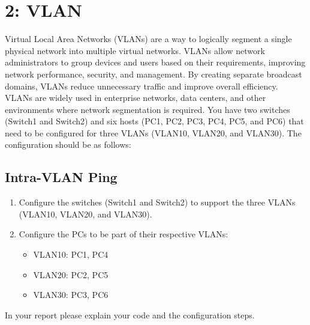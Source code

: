 \section{2: VLAN}
Virtual Local Area Networks (VLANs) are a way to logically segment a single physical network into multiple virtual networks. VLANs allow network administrators to group devices and users based on their requirements, improving network performance, security, and management. By creating separate broadcast domains, VLANs reduce unnecessary traffic and improve overall efficiency. VLANs are widely used in enterprise networks, data centers, and other environments where network segmentation is required.
You have two switches (Switch1 and Switch2) and six hosts (PC1, PC2, PC3, PC4, PC5, and PC6) that need to be configured for three VLANs (VLAN10, VLAN20, and VLAN30). The configuration should be as follows:

\subsection{Intra-VLAN Ping}

\begin{enumerate}[label=\Roman*.]
    \item Configure the switches (Switch1 and Switch2) to support the three VLANs (VLAN10, VLAN20, and VLAN30).
    \item Configure the PCs to be part of their respective VLANs:
    \begin{itemize}
        \item VLAN10: PC1, PC4
        \item VLAN20: PC2, PC5
        \item VLAN30: PC3, PC6
    \end{itemize}
\end{enumerate}

In your report please explain your code and the configuration steps.

